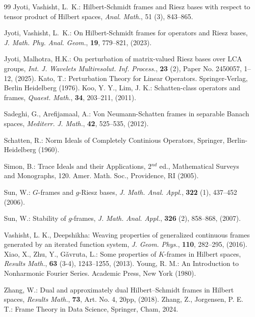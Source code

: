 \documentclass[reqno]{amsart}
\theoremstyle{plain}
\theoremstyle{remark}
\numberwithin{equation}{section}
\begin{document}
\begin{thebibliography}{99}
Jyoti, Vashisht, L.~K.:  Hilbert-Schmidt frames and Riesz bases with respect to tensor product of Hilbert spaces, \emph{Anal. Math.}, 51 (3), 843--865. 


Jyoti, Vashisht, L.~K.:  On Hilbert-Schmidt frames for operators and Riesz bases, \emph{J. Math. Phy. Anal. Geom.},  \textbf{19}, 779--821, (2023).

Jyoti, Malhotra, H.K.: On perturbation of matrix-valued Riesz bases over LCA groups, \emph{Int. J. Wavelets Multiresolut. Inf. Process.},   \textbf{23} (2), Paper No. 2450057,   1--12,  (2025).
Kato, T.:  Perturbation Theory for Linear Operators.  Springer-Verlag, Berlin Heidelberg (1976).
Koo, Y. Y.,  Lim, J. K.: Schatten-class operators and frames,  \emph{Quaest. Math.},  \textbf{34}, 203--211, (2011).

Sadeghi, G.,  Arefijamaal, A.:  Von Neumann-Schatten frames in separable Banach spaces, \emph{Mediterr. J. Math.},  \textbf{42}, 525–535, (2012).

Schatten, R.:  Norm Ideals of Completely Continious Operators,  Springer, Berlin-Heidelberg (1960).

Simon, B.:  Trace Ideals and their Applications,  2$^{nd}$ ed., Mathematical Surveys and Monographs, 120. Amer.  Math.  Soc., Providence, RI (2005).

Sun, W.: $G$-frames and {$g$}-{R}iesz bases,  \emph{J. Math. Anal. Appl.},  \textbf{322} (1), 437--452 (2006).

Sun, W.: Stability of {$g$}-frames,  \emph{ J. Math. Anal. Appl.},  \textbf{326}  (2),  858--868, (2007).

 Vashisht, L. K., Deepshikha: Weaving properties of generalized continuous frames generated  by an iterated
function system, \emph{ J. Geom. Phys.},  \textbf{110}, 282--295, (2016).
Xiao, X.,  Zhu, Y., G\v{a}vruta, L.: Some properties of $K$-frames in Hilbert spaces, \emph{ Results  Math.},  \textbf{63} (3-4),  1243--1255, (2013).
 Young, R. M.: An Introduction to Nonharmonic Fourier Series. Academic Press, New York (1980).

Zhang, W.: Dual and approximately dual Hilbert--Schmidt frames in Hilbert spaces, \emph{ Results  Math.},  \textbf{73}, Art. No. 4, 20pp, (2018).
Zhang, Z.,   Jorgensen, P. E. T.: Frame Theory in Data Science,  Springer, Cham, 2024.
\end{thebibliography}
\mbox{}
\end{document}
